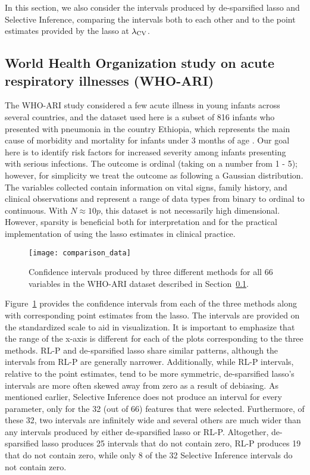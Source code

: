 In this section, we also consider the intervals produced by de-sparsified lasso and Selective Inference, comparing the intervals both to each other and to the point estimates provided by the lasso at $\lambda_{\textrm{CV}}$.

\subsection{World Health Organization study on acute respiratory illnesses (WHO-ARI)}\label{Sec:WHO-ARI}

The WHO-ARI study considered a few acute illness in young infants across several countries, and the dataset used here is a subset of 816 infants who presented with pneumonia in the country Ethiopia, which represents the main cause of morbidity and mortality for infants under 3 months of age \citep{Harrell1998}. Our goal here is to identify risk factors for increased severity among infants presenting with serious infections. The outcome is ordinal (taking on a number from 1 - 5); however, for simplicity we treat the outcome as following a Gaussian distribution. The variables collected contain information on vital signs, family history, and clinical observations and represent a range of data types from binary to ordinal to continuous. With $N \approx 10p$, this dataset is not necessarily high dimensional. However, sparsity is beneficial both for interpretation and for the practical implementation of using the lasso estimates in clinical practice.

\begin{figure}[htb!]
  \begin{center}
  \texttt{[image: comparison\_data]}
  \caption{\label{Fig:comparison_data_whoari} Confidence intervals produced by three different methods for all 66 variables in the WHO-ARI dataset described in Section~\ref{Sec:WHO-ARI}.}
  \end{center}
\end{figure}

Figure~\ref{Fig:comparison_data_whoari} provides the confidence intervals from each of the three methods along with corresponding point estimates from the lasso. The intervals are provided on the standardized scale to aid in visualization. It is important to emphasize that the range of the x-axis is different for each of the plots corresponding to the three methods. RL-P and de-sparsified lasso share similar patterns, although the intervals from RL-P are generally narrower. Additionally, while RL-P intervals, relative to the point estimates, tend to be more symmetric, de-sparsified lasso's intervals are more often skewed away from zero as a result of debiasing. As mentioned earlier, Selective Inference does not produce an interval for every parameter, only for the 32 (out of 66) features that were selected. Furthermore, of these 32, two intervals are infinitely wide and several others are much wider than any intervals produced by either de-sparsified lasso or RL-P. Altogether, de-sparsified lasso produces 25 intervals that do not contain zero, RL-P produces 19 that do not contain zero, while only 8 of the 32 Selective Inference intervals do not contain zero.

